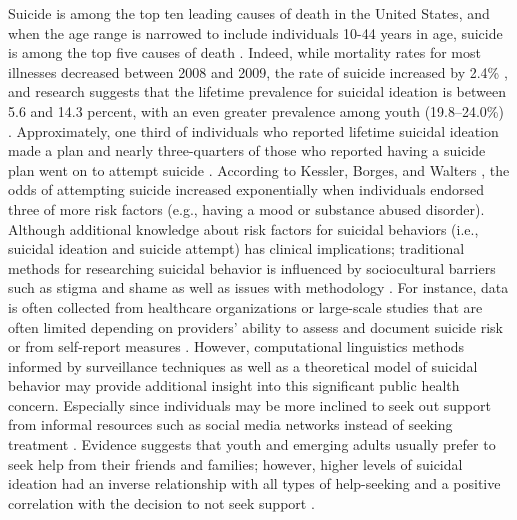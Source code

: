 \documentclass[11pt]{article}
\begin{document}
Suicide is among the top ten leading causes of death in the United States, and when the age range is narrowed to include individuals 10-44 years in age, suicide is among the top five causes of death \cite{heron2009deaths}. Indeed, while mortality rates for most illnesses decreased between 2008 and 2009, the rate of suicide increased by 2.4\%  \cite{heron2009deaths}, and research suggests that the lifetime prevalence for suicidal ideation is between 5.6 and 14.3 percent, with an even greater prevalence among youth (19.8–24.0\%) \cite{nock2008suicide}. Approximately, one third of individuals who reported lifetime suicidal ideation made a plan and nearly three-quarters of those who reported having a suicide plan went on to attempt suicide \cite{kessler1999prevalence}. According to Kessler, Borges, and Walters  \cite{kessler1999prevalence}, the odds of attempting suicide increased exponentially when individuals endorsed three of more risk factors (e.g., having a mood or substance abused disorder).
	Although additional knowledge about risk factors for suicidal behaviors (i.e., suicidal ideation and suicide attempt) has clinical implications; traditional methods for researching suicidal behavior is influenced by sociocultural barriers such as stigma and shame as well as issues with methodology \cite{crosby2011self}. For instance, data is often collected from healthcare organizations or large-scale studies that are often limited depending on providers’ ability to assess and document suicide risk or from self-report measures \cite{crosby2011self,horowitz2009suicide}. However, computational linguistics methods informed by surveillance techniques as well as a theoretical model of suicidal behavior may provide additional insight into this significant public health concern. Especially since individuals may be more inclined to seek out support from informal resources such as social media networks instead of seeking treatment \cite{crosby2011self,bruffaerts2011treatment,ryan2010universal}. Evidence suggests that youth and emerging adults usually prefer to seek help from their friends and families; however, higher levels of suicidal ideation had an inverse relationship with all types of help-seeking and a positive correlation with the decision to not seek support \cite{deane2001suicidal}.   
\end{document}
